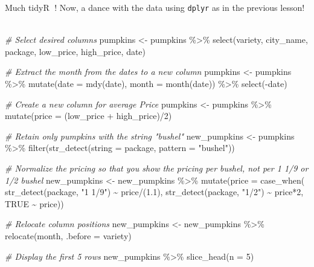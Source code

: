 \documentclass[
]{article}
\newenvironment{Shaded}{\begin{snugshade}}{\end{snugshade}}
\newcommand{\AttributeTok}[1]{\textcolor[rgb]{0.77,0.63,0.00}{#1}}
\newcommand{\CommentTok}[1]{\textcolor[rgb]{0.56,0.35,0.01}{\textit{#1}}}
\newcommand{\ConstantTok}[1]{\textcolor[rgb]{0.00,0.00,0.00}{#1}}
\newcommand{\DecValTok}[1]{\textcolor[rgb]{0.00,0.00,0.81}{#1}}
\newcommand{\FloatTok}[1]{\textcolor[rgb]{0.00,0.00,0.81}{#1}}
\newcommand{\FunctionTok}[1]{\textcolor[rgb]{0.00,0.00,0.00}{#1}}
\newcommand{\NormalTok}[1]{#1}
\newcommand{\OtherTok}[1]{\textcolor[rgb]{0.56,0.35,0.01}{#1}}
\newcommand{\SpecialCharTok}[1]{\textcolor[rgb]{0.00,0.00,0.00}{#1}}
\newcommand{\StringTok}[1]{\textcolor[rgb]{0.31,0.60,0.02}{#1}}
\begin{document}
Much tidyR 🧹! Now, a dance with the data using \texttt{dplyr} as in the
previous lesson! 💃

\begin{Shaded}
\begin{Highlighting}[]
\CommentTok{\# Select desired columns}
\NormalTok{pumpkins }\OtherTok{\textless{}{-}}\NormalTok{ pumpkins }\SpecialCharTok{\%\textgreater{}\%} 
  \FunctionTok{select}\NormalTok{(variety, city\_name, package, low\_price, high\_price, date)}



\CommentTok{\# Extract the month from the dates to a new column}
\NormalTok{pumpkins }\OtherTok{\textless{}{-}}\NormalTok{ pumpkins }\SpecialCharTok{\%\textgreater{}\%}
  \FunctionTok{mutate}\NormalTok{(}\AttributeTok{date =} \FunctionTok{mdy}\NormalTok{(date),}
         \AttributeTok{month =} \FunctionTok{month}\NormalTok{(date)) }\SpecialCharTok{\%\textgreater{}\%} 
  \FunctionTok{select}\NormalTok{(}\SpecialCharTok{{-}}\NormalTok{date)}



\CommentTok{\# Create a new column for average Price}
\NormalTok{pumpkins }\OtherTok{\textless{}{-}}\NormalTok{ pumpkins }\SpecialCharTok{\%\textgreater{}\%} 
  \FunctionTok{mutate}\NormalTok{(}\AttributeTok{price =}\NormalTok{ (low\_price }\SpecialCharTok{+}\NormalTok{ high\_price)}\SpecialCharTok{/}\DecValTok{2}\NormalTok{)}


\CommentTok{\# Retain only pumpkins with the string "bushel"}
\NormalTok{new\_pumpkins }\OtherTok{\textless{}{-}}\NormalTok{ pumpkins }\SpecialCharTok{\%\textgreater{}\%} 
  \FunctionTok{filter}\NormalTok{(}\FunctionTok{str\_detect}\NormalTok{(}\AttributeTok{string =}\NormalTok{ package, }\AttributeTok{pattern =} \StringTok{"bushel"}\NormalTok{))}


\CommentTok{\# Normalize the pricing so that you show the pricing per bushel, not per 1 1/9 or 1/2 bushel}
\NormalTok{new\_pumpkins }\OtherTok{\textless{}{-}}\NormalTok{ new\_pumpkins }\SpecialCharTok{\%\textgreater{}\%} 
  \FunctionTok{mutate}\NormalTok{(}\AttributeTok{price =} \FunctionTok{case\_when}\NormalTok{(}
    \FunctionTok{str\_detect}\NormalTok{(package, }\StringTok{"1 1/9"}\NormalTok{) }\SpecialCharTok{\textasciitilde{}}\NormalTok{ price}\SpecialCharTok{/}\NormalTok{(}\FloatTok{1.1}\NormalTok{),}
    \FunctionTok{str\_detect}\NormalTok{(package, }\StringTok{"1/2"}\NormalTok{) }\SpecialCharTok{\textasciitilde{}}\NormalTok{ price}\SpecialCharTok{*}\DecValTok{2}\NormalTok{,}
    \ConstantTok{TRUE} \SpecialCharTok{\textasciitilde{}}\NormalTok{ price))}

\CommentTok{\# Relocate column positions}
\NormalTok{new\_pumpkins }\OtherTok{\textless{}{-}}\NormalTok{ new\_pumpkins }\SpecialCharTok{\%\textgreater{}\%} 
  \FunctionTok{relocate}\NormalTok{(month, }\AttributeTok{.before =}\NormalTok{ variety)}


\CommentTok{\# Display the first 5 rows}
\NormalTok{new\_pumpkins }\SpecialCharTok{\%\textgreater{}\%} 
  \FunctionTok{slice\_head}\NormalTok{(}\AttributeTok{n =} \DecValTok{5}\NormalTok{)}
\end{Highlighting}
\end{Shaded}
\end{document}

